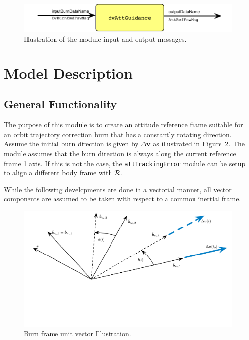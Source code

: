 

\begin{figure}[h]
	\centerline{
		\includegraphics{Figures/moduleImg}
	}
	\caption{Illustration of the module input and output messages.}
	\label{fig:moduleImg}
\end{figure}


\section{Model Description}
\subsection{General Functionality}
The purpose of this module is to create an attitude reference frame suitable for an orbit trajectory correction burn that has a constantly rotating direction.  Assume the initial burn direction is given by $\Delta \bm v$ as illustrated in Figure~\ref{fig:concept}.  The module assumes that the burn direction is always along the current reference frame 1 axis.  If this is not the case, the {\tt attTrackingError} module can be setup to align a different body frame with $\cal R$.  

While the following developments are done in a vectorial manner, all vector components are assumed to be taken with respect to a common inertial frame. 

\begin{figure}[htb]
	\centerline{
	\includegraphics[]{Figures/concept}
	}
	\caption{Burn frame unit vector Illustration.}
	\label{fig:concept}
\end{figure}


